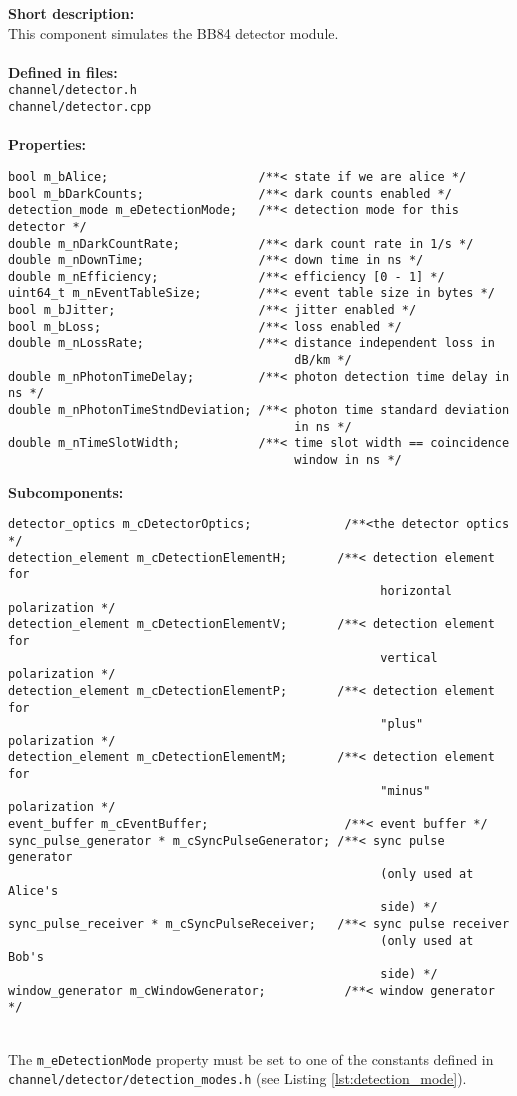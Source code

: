 \textbf{Short description:}\\
This component simulates the BB84 detector module.\\
\\
\textbf{Defined in files:}\\
\texttt{channel/detector.h}\\
\texttt{channel/detector.cpp}\\
\\
\textbf{Properties:}
\begin{lstlisting}
bool m_bAlice;                     /**< state if we are alice */
bool m_bDarkCounts;                /**< dark counts enabled */
detection_mode m_eDetectionMode;   /**< detection mode for this detector */
double m_nDarkCountRate;           /**< dark count rate in 1/s */
double m_nDownTime;                /**< down time in ns */
double m_nEfficiency;              /**< efficiency [0 - 1] */
uint64_t m_nEventTableSize;        /**< event table size in bytes */
bool m_bJitter;                    /**< jitter enabled */
bool m_bLoss;                      /**< loss enabled */
double m_nLossRate;                /**< distance independent loss in 
                                        dB/km */
double m_nPhotonTimeDelay;         /**< photon detection time delay in ns */
double m_nPhotonTimeStndDeviation; /**< photon time standard deviation 
                                        in ns */
double m_nTimeSlotWidth;           /**< time slot width == coincidence
                                        window in ns */
\end{lstlisting}
\noindent
\textbf{Subcomponents:}
\begin{lstlisting}
detector_optics m_cDetectorOptics;             /**<the detector optics */
detection_element m_cDetectionElementH;       /**< detection element for
                                                    horizontal polarization */
detection_element m_cDetectionElementV;       /**< detection element for
                                                    vertical polarization */
detection_element m_cDetectionElementP;       /**< detection element for
                                                    "plus" polarization */
detection_element m_cDetectionElementM;       /**< detection element for
                                                    "minus" polarization */
event_buffer m_cEventBuffer;                   /**< event buffer */
sync_pulse_generator * m_cSyncPulseGenerator; /**< sync pulse generator
                                                    (only used at Alice's
                                                    side) */
sync_pulse_receiver * m_cSyncPulseReceiver;   /**< sync pulse receiver
                                                    (only used at Bob's
                                                    side) */
window_generator m_cWindowGenerator;           /**< window generator */
\end{lstlisting}
\noindent
\\
The \texttt{m\_eDetectionMode} property must be set to one of the constants defined in \texttt{channel/detector/detection\_modes.h} (see Listing \ref{lst:detection_mode}).

